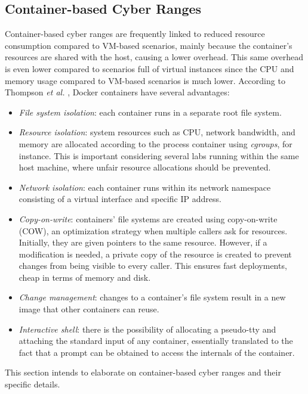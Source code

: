 \subsection{Container-based Cyber Ranges}

Container-based cyber ranges are frequently linked to reduced resource consumption compared to VM-based scenarios, mainly because the container's resources are shared with the host, causing a lower overhead. This same overhead is even lower compared to scenarios full of virtual instances since the CPU and memory usage compared to VM-based scenarios is much lower. According to Thompson \textit{et al.} \cite{labtainers_ref}, Docker containers have several advantages:

\begin{itemize}
    \item \textit{File system isolation}: each container runs in a separate root file system.
    \item \textit{Resource isolation}: system resources such as CPU, network bandwidth, and memory are allocated according to the process container using \textit{cgroups}, for instance. This is important considering several labs running within the same host machine, where unfair resource allocations should be prevented.
    \item \textit{Network isolation}: each container runs within its network namespace consisting of a virtual interface and specific IP address.
    \item \textit{Copy-on-write}: containers' file systems are created using copy-on-write (COW), an optimization strategy when multiple callers ask for resources. Initially, they are given pointers to the same resource. However, if a modification is needed, a private copy of the resource is created to prevent changes from being visible to every caller. This ensures fast deployments, cheap in terms of memory and disk.
    \item \textit{Change management}: changes to a container's file system result in a new image that other containers can reuse.
    \item \textit{Interactive shell}: there is the possibility of allocating a pseudo-tty and attaching the standard input of any container, essentially translated to the fact that a prompt can be obtained to access the internals of the container.
\end{itemize}

This section intends to elaborate on container-based cyber ranges and their specific details.


